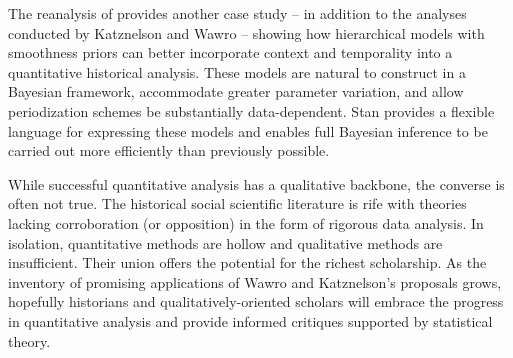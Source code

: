 The reanalysis of 
provides another case study -- in addition to the analyses conducted by Katznelson and 
Wawro -- showing how hierarchical models with smoothness priors can better incorporate 
context and temporality into a quantitative historical analysis. These models are 
natural to construct in a Bayesian framework, accommodate greater parameter variation, 
and allow periodization schemes be substantially data-dependent.  
Stan provides a flexible language for expressing these models and 
enables full Bayesian inference to be carried out more efficiently than 
previously possible.  

While successful quantitative analysis has a qualitative backbone, 
the converse is often not true. The historical social scientific literature 
is rife with theories lacking corroboration (or opposition) in the form of rigorous 
data analysis. In isolation, quantitative methods are hollow and
qualitative methods are insufficient. Their union offers the potential for 
the richest scholarship. As the inventory of promising applications of Wawro and 
Katznelson's proposals grows, hopefully historians and qualitatively-oriented 
scholars will embrace the progress in quantitative analysis and provide informed 
critiques supported by statistical theory. 

